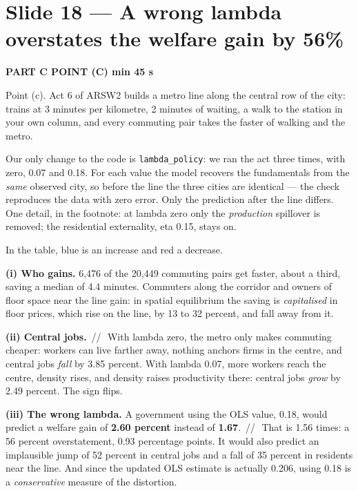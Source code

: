 \documentclass[11pt,a4paper]{article}
\newcommand{\slide}[3]{\Needspace{14\baselineskip}\section{#1}\textcolor{unicared}{\small\bfseries\MakeUppercase{#3}\quad\textperiodcentered\quad #2}\par}
\newcommand{\pause}{\textcolor{unicared}{\,/\!/\,}}
\begin{document}
\slide{Slide 18 --- A wrong lambda overstates the welfare gain by 56\%}{1 min 45 s}{Part C \textperiodcentered{} point (c)}

\begin{say}
Point (c). Act 6 of ARSW2 builds a metro line along the central row of the city: trains at 3 minutes per kilometre, 2 minutes of waiting, a walk to the station in your own column, and every commuting pair takes the faster of walking and the metro.

Our only change to the code is \texttt{lambda\_policy}: we ran the act three times, with zero, 0.07 and 0.18. For each value the model recovers the fundamentals from the \emph{same} observed city, so before the line the three cities are identical --- the check reproduces the data with zero error. Only the prediction after the line differs. One detail, in the footnote: at lambda zero only the \emph{production} spillover is removed; the residential externality, eta 0.15, stays on.

In the table, blue is an increase and red a decrease.

\textbf{(i) Who gains.} 6,476 of the 20,449 commuting pairs get faster, about a third, saving a median of 4.4 minutes. Commuters along the corridor and owners of floor space near the line gain: in spatial equilibrium the saving is \emph{capitalised} in floor prices, which rise on the line, by 13 to 32 percent, and fall away from it.

\textbf{(ii) Central jobs.} \pause\ With lambda zero, the metro only makes commuting cheaper: workers can live farther away, nothing anchors firms in the centre, and central jobs \emph{fall} by 3.85 percent. With lambda 0.07, more workers reach the centre, density rises, and density raises productivity there: central jobs \emph{grow} by 2.49 percent. The sign flips.

\textbf{(iii) The wrong lambda.} A government using the OLS value, 0.18, would predict a welfare gain of \textbf{2.60 percent} instead of \textbf{1.67}. \pause\ That is 1.56 times: a 56 percent overstatement, 0.93 percentage points. It would also predict an implausible jump of 52 percent in central jobs and a fall of 35 percent in residents near the line. And since the updated OLS estimate is actually 0.206, using 0.18 is a \emph{conservative} measure of the distortion.
\end{say}
\end{document}
